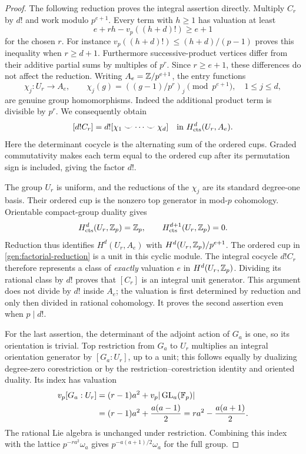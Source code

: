 \begin{proof}
The following reduction proves the integral assertion directly.
Multiply $C_r$ by $d!$ and work modulo $p^{e+1}$.  Every term with
$h\geq1$ has valuation at least
\[
 e+rh-v_p((h+d)!)\geq e+1
\]
for the chosen $r$.  For instance
$v_p((h+d)!)\leq(h+d)/(p-1)$ proves this inequality when
$r\geq d+1$.  Furthermore successive-product vertices differ from
their additive partial sums by multiples of $p^r$.  Since
$r\geq e+1$, these differences do not affect the reduction.
Writing $A_e=\mathbb Z/p^{e+1}$, the entry functions
\[
 \chi_j:U_r\longrightarrow A_e,
 \qquad \chi_j(g)=((g-1)/p^r)_j\pmod {p^{e+1}},
 \quad 1\leq j\leq d,
\]
are genuine group homomorphisms.  Indeed the additional product term
is divisible by $p^r$.  We consequently obtain
\begin{equation}\label{gen:factorial-reduction}
 [d!C_r]
  =d![\chi_1\smile\cdots\smile\chi_d]
   \quad\hbox{in }H^d_{\mathrm{cts}}(U_r,A_e).
\end{equation}
Here the determinant cocycle is the alternating sum of the ordered
cups.  Graded commutativity makes each term equal to the ordered cup
after its permutation sign is included, giving the factor $d!$.

The group $U_r$ is uniform, and the reductions of the $\chi_j$ are its
standard degree-one basis.  Their ordered cup is the nonzero top
generator in mod-$p$ cohomology.  Orientable compact-group duality
gives
\[
 H^d_{\mathrm{cts}}(U_r,\mathbb Z_p)=\mathbb Z_p,
 \qquad H^{d+1}_{\mathrm{cts}}(U_r,\mathbb Z_p)=0.
\]
Reduction thus identifies $H^d(U_r,A_e)$ with
$H^d(U_r,\mathbb Z_p)/p^{e+1}$.  The ordered cup in
\eqref{gen:factorial-reduction} is a unit in this cyclic module.
The integral cocycle $d!C_r$ therefore represents a class of
\emph{exactly} valuation $e$ in $H^d(U_r,\mathbb Z_p)$.  Dividing its
rational class by $d!$ proves that $[C_r]$ is an integral unit
generator.  This argument does not divide by $d!$ inside $A_e$;
the valuation is first determined by reduction and only then divided
in rational cohomology.  It proves the second assertion even when
$p\mid d!$.

For the last assertion, the determinant of the adjoint action of
$G_a$ is one, so its orientation is trivial.  Top restriction from
$G_a$ to $U_r$ multiplies an integral orientation generator by
$[G_a:U_r]$, up to a unit; this follows equally by dualizing degree-zero
corestriction or by the restriction--corestriction identity and
oriented duality.  Its index has valuation
\begin{align*}
 v_p[G_a:U_r]
  &=(r-1)a^2+v_p|\operatorname{GL}_a(\mathbb F_p)|\\
  &=(r-1)a^2+\frac{a(a-1)}2
   =ra^2-\frac{a(a+1)}2.
\end{align*}
The rational Lie algebra is unchanged under restriction.  Combining
this index with the lattice $p^{-ra^2}\omega_a$ gives
$p^{-a(a+1)/2}\omega_a$ for the full group.
\end{proof}

